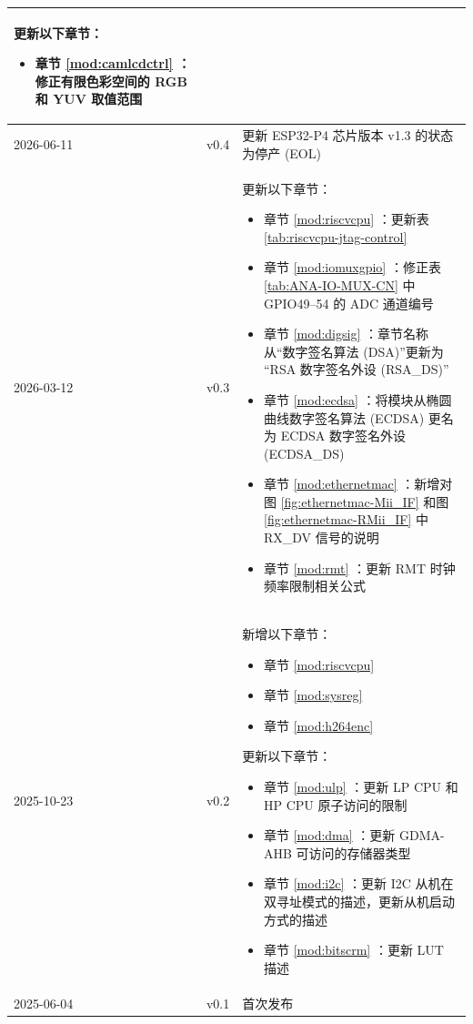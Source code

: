 \begin{longtable}[l]{ | m{2cm} | m{1.5cm} | m{12cm} | }
    更新以下章节：
    \begin{itemize}
        \item 章节 \ref{mod:camlcdctrl} \textit{\nameref{mod:camlcdctrl}}：修正有限色彩空间的 RGB 和 YUV 取值范围
    \end{itemize}
    \\\hline
    2026-06-11 & v0.4 &
    更新 ESP32-P4 芯片版本 v1.3 的状态为停产 (EOL)
    \\\hline
    2026-03-12 & v0.3 &
    更新以下章节：
    \begin{itemize}
        \item 章节 \ref{mod:riscvcpu} \textit{\nameref{mod:riscvcpu}}：更新表 \ref{tab:riscvcpu-jtag-control}
        \item 章节 \ref{mod:iomuxgpio} \textit{\nameref{mod:iomuxgpio}}：修正表 \ref{tab:ANA-IO-MUX-CN} \textit{\nameref{tab:ANA-IO-MUX-CN}} 中 GPIO49–54 的 ADC 通道编号 %
        \item 章节 \ref{mod:digsig} \textit{\nameref{mod:digsig}}：章节名称从“数字签名算法 (DSA)”更新为 “RSA 数字签名外设 (RSA\_DS)” %
        \item 章节 \ref{mod:ecdsa} \textit{\nameref{mod:ecdsa}}：将模块从椭圆曲线数字签名算法 (ECDSA) 更名为 ECDSA 数字签名外设 (ECDSA\_DS) %
        \item 章节 \ref{mod:ethernetmac} \textit{\nameref{mod:ethernetmac}}：新增对图 \ref{fig:ethernetmac-Mii_IF} 和图 \ref{fig:ethernetmac-RMii_IF} 中 RX\_DV 信号的说明 %
        \item 章节 \ref{mod:rmt} \textit{\nameref{mod:rmt}}：更新 RMT 时钟频率限制相关公式 %
    \end{itemize}
    \\\hline
    2025-10-23 & v0.2 &
    新增以下章节：
    \begin{itemize}
        \item 章节 \ref{mod:riscvcpu} \textit{\nameref{mod:riscvcpu}}
        \item 章节 \ref{mod:sysreg} \textit{\nameref{mod:sysreg}}
        \item 章节 \ref{mod:h264enc} \textit{\nameref{mod:h264enc}}
    \end{itemize}

    更新以下章节：
    \begin{itemize}
        \item 章节 \ref{mod:ulp} \textit{\nameref{mod:ulp}}：更新 LP CPU 和 HP CPU 原子访问的限制 %
        \item 章节 \ref{mod:dma} \textit{\nameref{mod:dma}}：更新 GDMA-AHB 可访问的存储器类型 %
        \item 章节 \ref{mod:i2c} \textit{\nameref{mod:i2c}}：更新 I2C 从机在双寻址模式的描述，更新从机启动方式的描述 %
        \item 章节 \ref{mod:bitscrm} \textit{\nameref{mod:bitscrm}}：更新 LUT 描述 %
    \end{itemize}
    \\\hline
    2025-06-04 & v0.1 & 首次发布\\\hline

\end{longtable}
